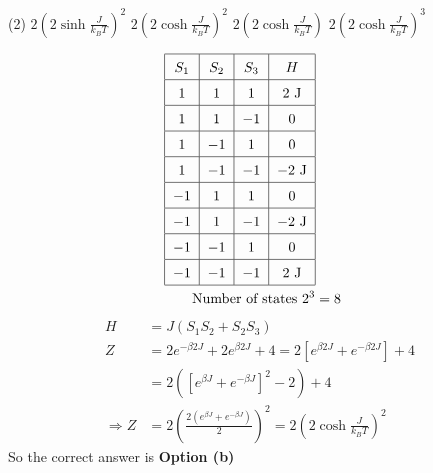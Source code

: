 \begin{enumerate}
	{ }
	\begin{tasks}(2)
		\task[\textbf{a.}] $2\left(2 \sinh \frac{J}{k_{B} T}\right)^{2}$
		\task[\textbf{b.}]  $2\left(2 \cosh \frac{J}{k_{B} T}\right)^{2}$
		\task[\textbf{c.}]  $2\left(2 \cosh \frac{J}{k_{B} T}\right)$
		\task[\textbf{d.}] $2\left(2 \cosh \frac{J}{k_{B} T}\right)^{3}$
	\end{tasks}
\begin{answer}
	\begin{align*}
	\renewcommand*{\arraystretch}{1.5}
	\begin{tabular}{|c|c|c|c|}
	\hline$S_{1}$ & $S_{2}$ & $S_{3}$ & $H$ \\
	\hline 1 & 1 & 1 & $2 \mathrm{~J}$ \\
	\hline 1 & 1 & $-1$ & 0 \\
	\hline 1 & $-1$ & 1 & 0 \\
	\hline 1 & $-1$ & $-1$ & $-2 \mathrm{~J}$ \\
	\hline$-1$ & 1 & 1 & 0 \\
	\hline$-1$ & 1 & $-1$ & $-2 \mathrm{~J}$ \\
	\hline$-1$ & $-1$ & 1 & 0 \\
	\hline$-1$ & $-1$ & $-1$ & $2 \mathrm{~J}$ \\
	\hline
	\end{tabular}\\
	\text{Number of states }2^{3}&=8\\
	\end{align*}
	\begin{align*}
	H&=J\left(S_{1} S_{2}+S_{2} S_{3}\right)\\
	Z&=2 e^{-\beta 2 J}+2 e^{\beta 2 J}+4=2\left[e^{\beta 2 J}+e^{-\beta 2 J}\right]+4\\&=2\left(\left[e^{\beta J}+e^{-\beta J}\right]^{2}-2\right)+4\\
	\Rightarrow Z&=2\left(\frac{2\left(e^{\beta J}+e^{-\beta J}\right)}{2}\right)^{2}=2\left(2 \cosh \frac{J}{k_{B} T}\right)^{2}
	\end{align*}
	So the correct answer is \textbf{Option (b)}
\end{answer}
\end{enumerate}
\setlength\arrayrulewidth{1pt}
